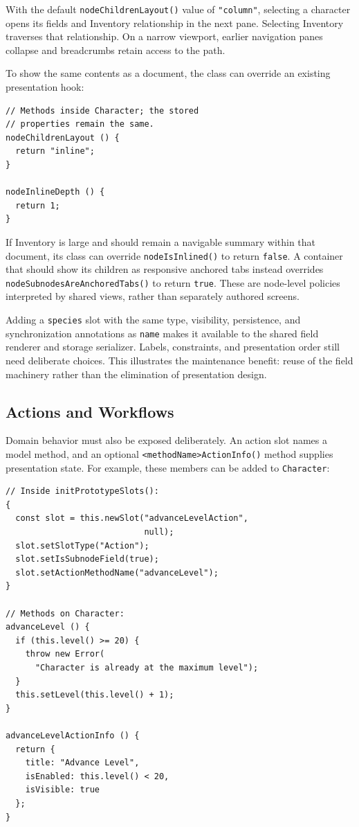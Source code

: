 \documentclass[sigplan,review,anonymous,10pt]{acmart}
\begin{document}
With the default \texttt{nodeChildrenLayout()} value of \texttt{"column"}, selecting a character opens its fields and Inventory relationship in the next pane. Selecting Inventory traverses that relationship. On a narrow viewport, earlier navigation panes collapse and breadcrumbs retain access to the path.

To show the same contents as a document, the class can override an existing presentation hook:

\begin{small}
\begin{verbatim}
// Methods inside Character; the stored
// properties remain the same.
nodeChildrenLayout () {
  return "inline";
}

nodeInlineDepth () {
  return 1;
}
\end{verbatim}
\end{small}

If Inventory is large and should remain a navigable summary within that document, its class can override \texttt{nodeIsInlined()} to return \texttt{false}. A container that should show its children as responsive anchored tabs instead overrides \texttt{nodeSubnodesAreAnchoredTabs()} to return \texttt{true}. These are node-level policies interpreted by shared views, rather than separately authored screens.

Adding a \texttt{species} slot with the same type, visibility, persistence, and synchronization annotations as \texttt{name} makes it available to the shared field renderer and storage serializer. Labels, constraints, and presentation order still need deliberate choices. This illustrates the maintenance benefit: reuse of the field machinery rather than the elimination of presentation design.

\subsection{Actions and Workflows}
\label{sec:actions}

Domain behavior must also be exposed deliberately. An action slot names a model method, and an optional \texttt{<methodName>ActionInfo()} method supplies presentation state. For example, these members can be added to \texttt{Character}:

\begin{small}
\begin{verbatim}
// Inside initPrototypeSlots():
{
  const slot = this.newSlot("advanceLevelAction",
                            null);
  slot.setSlotType("Action");
  slot.setIsSubnodeField(true);
  slot.setActionMethodName("advanceLevel");
}

// Methods on Character:
advanceLevel () {
  if (this.level() >= 20) {
    throw new Error(
      "Character is already at the maximum level");
  }
  this.setLevel(this.level() + 1);
}

advanceLevelActionInfo () {
  return {
    title: "Advance Level",
    isEnabled: this.level() < 20,
    isVisible: true
  };
}
\end{verbatim}
\end{small}
\end{document}

